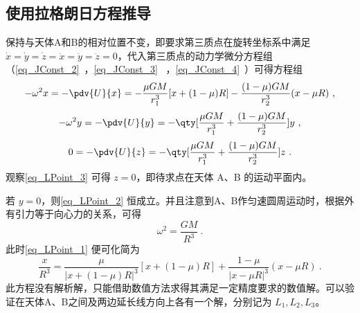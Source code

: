 



\subsection{使用拉格朗日方程推导}

保持与天体A和B的相对位置不变，即要求第三质点在旋转坐标系中满足 $\dot{x}=\dot{y}=\dot{z}=\ddot{x}=\ddot{y}=\ddot{z}=0$，代入第三质点的动力学微分方程组（\autoref{eq_JConst_2}~，\autoref{eq_JConst_3}~ ，\autoref{eq_JConst_4}~）可得方程组
\begin{equation}\label{eq_LPoint_1}
-\omega^2 x =- \pdv{U}{x}=-\frac{\mu GM}{r_1^3}[x+(1-\mu)R]-\frac{(1-\mu)GM}{r_2^3}(x-\mu R)~,
\end{equation}
\begin{equation}\label{eq_LPoint_2}
-\omega^2 y =- \pdv{U}{y}=-\qty[\frac{\mu GM}{r_1^3}+\frac{(1-\mu)GM}{r_2^3}]y~,
\end{equation}
\begin{equation}\label{eq_LPoint_3}
0 =- \pdv{U}{z} =-\qty[\frac{\mu GM}{r_1^3}+\frac{(1-\mu)GM}{r_2^3}]z~.
\end{equation}
观察\autoref{eq_LPoint_3} 可得 $z=0$，即待求点在天体 A、B 的运动平面内。

若 $y=0$，则\autoref{eq_LPoint_2} 恒成立。并且注意到A、B作匀速圆周运动时，根据外有引力等于向心力的关系，可得
\begin{equation}%
\omega^2 =\frac{GM}{R^3}~.
\end{equation}
此时\autoref{eq_LPoint_1} 便可化简为
\begin{equation}%
\frac{x}{R^3} =\frac{\mu}{|x+(1-\mu)R|^3}[x+(1-\mu)R]+\frac{1-\mu}{|x-\mu R|^3}(x-\mu R)~.
\end{equation}
此方程没有解析解，只能借助数值方法求得其满足一定精度要求的数值解。可以验证在天体A、B之间及两边延长线方向上各有一个解，分别记为 $L_1,L_2,L_3$。

